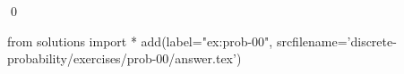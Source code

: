 
\begin{ex} 
  \label{ex:prob-00}
  
  \qed
\end{ex} 
\begin{python0}
from solutions import *
add(label="ex:prob-00",
    srcfilename='discrete-probability/exercises/prob-00/answer.tex') 
\end{python0}
